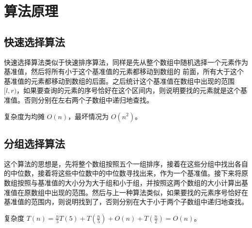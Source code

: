 \section{算法原理}

\subsection{快速选择算法}

快速选择算法类似于快速排序算法，同样是先从整个数组中随机选择一个元素作为基准值，然后将所有小于这个基准值的元素都移动到数组的 前面，所有大于这个基准值的元素都移动到数组的后面。之后统计这个基准值在数组中出现的范围 $[l, r)$，如果要查询的元素的序号恰好在这个区间内，则说明要找的元素就是这个基准值。否则分别在左右两个子数组中递归地查找。

复杂度为均摊 $O(n)$，最坏情况为 $O(n^2)$。

\subsection{分组选择算法}

这个算法的思想是，先将整个数组按照五个一组排序，接着在这些分组中找出各自的中位数，接着将这些中位数中的中位数寻找出来，作为一个基准值。接下来将原数组按照与基准值的大小分为大于组和小于组，并按照这两个数组的大小计算出基准值在原数组中出现的范围。然后与上一种算法类似，如果要找的元素序号恰好在基准值的范围内，则说明找到了，否则分别在大于小于两个子数组中递归地查找。

复杂度 $T(n) = \frac{n}{5} T(5) + T(\frac{n}{5}) + O(n) + T(\frac{n}{2}) = O(n)$。

